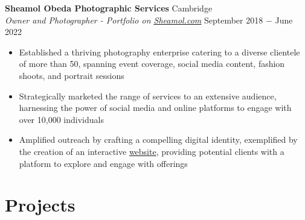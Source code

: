 \documentclass{article}
\begin{document}
\textbf{Sheamol Obeda Photographic Services} \hfill Cambridge\\
\textit{Owner and Photographer - Portfolio on \href{www.sheamol.com}{\underline{Sheamol.com}}} \hfill September 2018 $-$ June 2022
\begin{itemize}
    \item Established a thriving photography enterprise catering to a diverse clientele of more than 50, spanning event coverage, social media content, fashion shoots, and portrait sessions
    \item Strategically marketed the range of services to an extensive audience, harnessing the power of social media and online platforms to engage with over 10,000 individuals
    \item Amplified outreach by crafting a compelling digital identity, exemplified by the creation of an interactive \href{www.sheamol.com}{website}, providing potential clients with a platform to explore and engage with offerings
\end{itemize} \medskip


\vspace{-0.75\baselineskip}
\hrulefill
\vspace{-0.75\baselineskip}

\section*{Projects}
\end{document}
